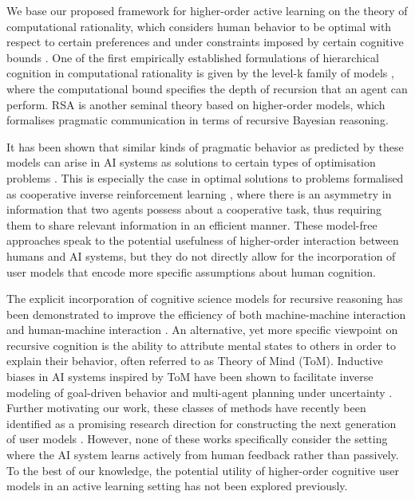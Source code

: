 \documentclass[letterpaper]{article} %
\begin{document}
We base our proposed framework for higher-order active learning on the theory of computational rationality, which considers human behavior to be optimal with respect to certain preferences and under constraints imposed by certain cognitive bounds \cite{gerchman2015computationalrationality}. One of the first empirically established formulations of hierarchical cognition in computational rationality is given by the level-k family of models \cite{Stahl1995level-k}, where the computational bound specifies the depth of recursion that an agent can perform. RSA \cite{goodman2016rsa} is another seminal theory based on higher-order models, which formalises pragmatic communication in terms of recursive Bayesian reasoning.

It has been shown that similar kinds of pragmatic behavior as predicted by these models can arise in AI systems as solutions to certain types of optimisation problems \cite{malik2018efficientbellman, Fisac2020Pragmatic-pedagogic}. This is especially the case in optimal solutions to problems formalised as cooperative inverse reinforcement learning \cite{Hadfield-Menell2016cirl}, where there is an asymmetry in information that two agents possess about a cooperative task, thus requiring them to share relevant information in an efficient manner. These model-free approaches speak to the potential usefulness of higher-order interaction between humans and AI systems, but they do not directly allow for the incorporation of user models that encode more specific assumptions about human cognition.

The explicit incorporation of cognitive science models for recursive reasoning has been demonstrated to improve the efficiency of both machine-machine interaction \cite{wen2018probabilistic, wu2021bayesiandelegation, Moreno2021NeuralRB} and human-machine interaction \cite{Ho2016showingversusdoing, Milli2019LiteralOP, Sumers2022howtotalk}. An alternative, yet more specific viewpoint on recursive cognition is the ability to attribute mental states to others in order to explain their behavior, often referred to as Theory of Mind (ToM). Inductive biases in AI systems inspired by ToM have been shown to facilitate inverse modeling of goal-driven behavior and multi-agent planning under uncertainty \cite{rabinowitz2018mtom, foerster2019bad, wu2021bayesiandelegation}. Further motivating our work, these classes of methods have recently been identified as a promising research direction for constructing the next generation of user models \cite{celikok2023modeling}. However, none of these works specifically consider the setting where the AI system learns actively from human feedback rather than passively. To the best of our knowledge, the potential utility of higher-order cognitive user models in an active learning setting has not been explored previously.
\end{document}
